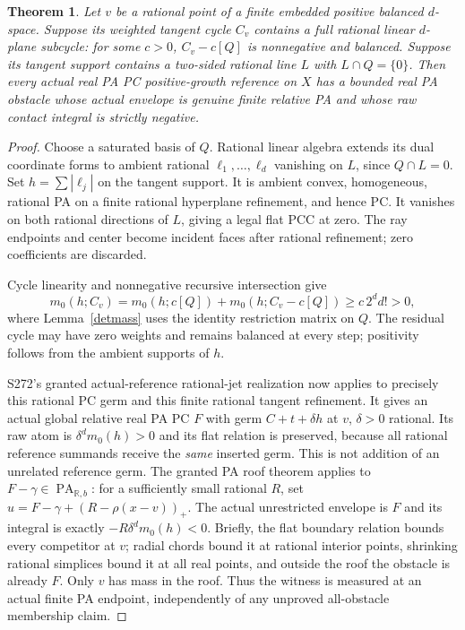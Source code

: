 \documentclass[11pt]{article}
\newtheorem{theorem}{Theorem}
\newcommand{\R}{\mathbb R}
\newcommand{\PA}{\operatorname{PA}}
\begin{document}
\begin{theorem}\label{transverse}
Let $v$ be a rational point of a finite embedded positive balanced
$d$-space. Suppose its weighted tangent cycle $C_v$ contains a full
rational linear $d$-plane subcycle: for some $c>0$,
$C_v-c[Q]$ is nonnegative and balanced. Suppose its tangent support
contains a two-sided rational line $L$ with $L\cap Q=\{0\}$.
Then every actual real PA PC positive-growth reference on $X$ has a
bounded real PA obstacle whose actual envelope is genuine finite relative
PA and whose raw contact integral is strictly negative.
\end{theorem}
\begin{proof}
Choose a saturated basis of $Q$. Rational linear algebra extends its
dual coordinate forms to ambient rational $\ell_1,\ldots,\ell_d$
vanishing on $L$, since $Q\cap L=0$. Set $h=\sum|\ell_j|$ on the
tangent support. It is ambient convex, homogeneous, rational PA on
a finite rational hyperplane refinement, and hence PC. It vanishes
on both rational directions of $L$, giving a legal flat PCC at zero.
The ray endpoints and center become incident faces after rational
refinement; zero coefficients are discarded.

Cycle linearity and nonnegative recursive intersection give
\[
 m_0(h;C_v)=m_0(h;c[Q])+m_0(h;C_v-c[Q])
                       \geq c\,2^d d!>0,
\]
where Lemma~\ref{detmass} uses the identity restriction matrix on $Q$.
The residual cycle may have zero weights and remains balanced at every
step; positivity follows from the ambient supports of $h$.

S272's granted actual-reference rational-jet realization now applies
to precisely this rational PC germ and this finite rational tangent
refinement. It gives an actual global relative real PA PC $F$ with
germ $C+t+\delta h$ at $v$, $\delta>0$ rational. Its raw atom is
$\delta^d m_0(h)>0$ and its flat relation is preserved, because
all rational reference summands receive the \emph{same} inserted germ.
This is not addition of an unrelated reference germ.
The granted PA roof theorem applies to $F-\gamma\in\PA_{\R,b}$:
for a sufficiently small rational $R$, set
$u=F-\gamma+(R-\rho(x-v))_+$. The actual unrestricted envelope is
$F$ and its integral is exactly $-R\delta^d m_0(h)<0$. Briefly, the
flat boundary relation bounds every competitor at $v$; radial chords
bound it at rational interior points, shrinking rational simplices
bound it at all real points, and outside the roof the obstacle is
already $F$. Only $v$ has mass in the roof. Thus the witness is
measured at an actual finite PA endpoint, independently of any
unproved all-obstacle membership claim.
\end{proof}
\end{document}
